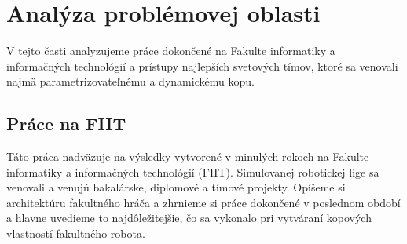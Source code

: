 \section{Analýza problémovej oblasti}
V tejto časti analyzujeme práce dokončené na Fakulte informatiky a informačných technológií a prístupy najlepších svetových tímov, ktoré sa venovali najmä parametrizovateľnému a dynamickému kopu.

\subsection{Práce na FIIT}

Táto práca nadväzuje na výsledky vytvorené v minulých rokoch na Fakulte informatiky a informačných technológií (FIIT). Simulovanej robotickej lige sa venovali a venujú bakalárske, diplomové a tímové projekty. Opíšeme si architektúru fakultného hráča a zhrnieme si práce dokončené v poslednom období a hlavne uvedieme to najdôležitejšie, čo sa vykonalo pri vytváraní kopových vlastností fakultného robota.